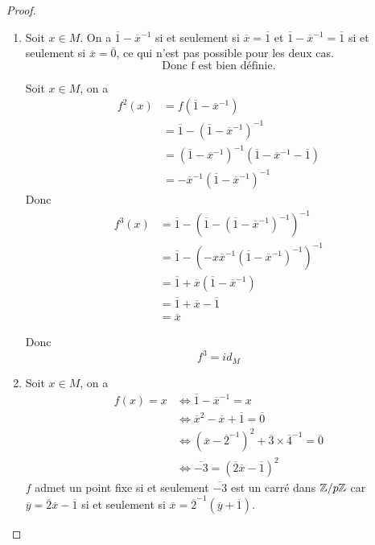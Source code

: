 \begin{proof}
	\phantom{}
	\begin{enumerate}
		\item Soit $x\in M$. On a $\overline{1}-\overline{x}^{-1}$ si et seulement si $\overline{x}=\overline{1}$ et $\overline{1}-\overline{x}^{-1}=\overline{1}$ si et seulement si $\overline{x}=\overline{0}$, ce qui n'est pas possible pour les deux cas. 
		\begin{equation}
			\boxed{\text{Donc f est bien définie.}}
		\end{equation}
		
		Soit $x\in M$, on a 
		\begin{align}
			f^{2}(x)
			&=f(\overline{1}-\overline{x}^{-1})\\
			&=\overline{1}-(\overline{1}-\overline{x}^{-1})^{-1}\\
			&=(\overline{1}-\overline{x}^{-1})^{-1}(\overline{1}-\overline{x}^{-1}-\overline{1})\\
			&=-\overline{x}^{-1}(\overline{1}-\overline{x}^{-1})^{-1}
		\end{align}
		Donc 
		\begin{align}
			f^{3}(x)
			&=\overline{1}-(\overline{1}-(\overline{1}-\overline{x}^{-1})^{-1})^{-1}\\
			&=\overline{1}-(-x\overline{x}^{-1}(\overline{1}-\overline{x}^{-1})^{-1})^{-1}\\
			&=\overline{1}+\overline{x}(\overline{1}-\overline{x}^{-1})\\
			&=\overline{1}+\overline{x}-\overline{1}\\
			&=\overline{x}
		\end{align}

		Donc
		\begin{equation}
			f^{3}=id_{M}
		\end{equation}

		\item Soit $x\in M$, on a 
		\begin{align}
			f(x)=x
			&\Longleftrightarrow \overline{1}-\overline{x}^{-1}=x\\
			&\Longleftrightarrow \overline{x}^{2}-\overline{x}+\overline{1}=\overline{0}\\
			&\Longleftrightarrow (\overline{x}-\overline{2}^{-1})^{2}+\overline{3}\times\overline{4}^{-1}=\overline{0}\\
			&\Longleftrightarrow \overline{-3}=(\overline{2}\overline{x}-\overline{1})^{2}
		\end{align}
		$f$ admet un point fixe si et seulement $\overline{-3}$ est un carré dans $\mathbb{Z}/p\mathbb{Z}$ car $\overline{y}=\overline{2}\overline{x}-\overline{1}$ si et seulement si $\overline{x}=\overline{2}^{-1}(\overline{y}+\overline{1})$.
		

\end{enumerate}
\end{proof}
